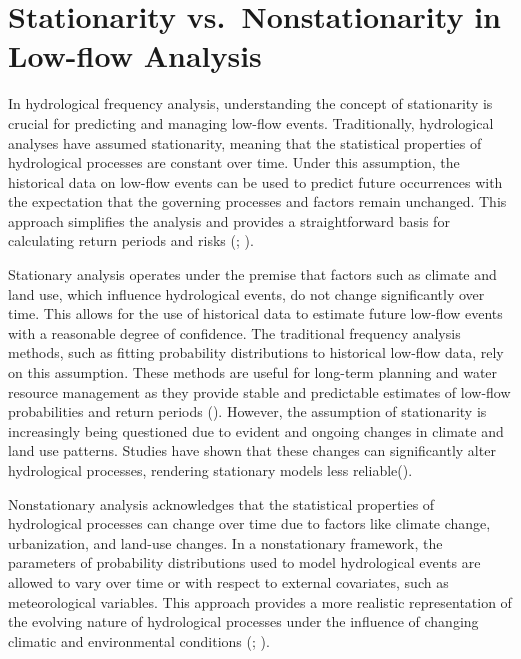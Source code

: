 \documentclass[
]{krantz}
\begin{document}
\section{Stationarity vs.~Nonstationarity in Low-flow Analysis}\label{stationarity-vs.-nonstationarity-in-low-flow-analysis}

In hydrological frequency analysis, understanding the concept of stationarity is crucial for predicting and managing low-flow events. Traditionally, hydrological analyses have assumed stationarity, meaning that the statistical properties of hydrological processes are constant over time. Under this assumption, the historical data on low-flow events can be used to predict future occurrences with the expectation that the governing processes and factors remain unchanged. This approach simplifies the analysis and provides a straightforward basis for calculating return periods and risks (\citet{Gilroy2012}; \citet{Katz2013}).

Stationary analysis operates under the premise that factors such as climate and land use, which influence hydrological events, do not change significantly over time. This allows for the use of historical data to estimate future low-flow events with a reasonable degree of confidence. The traditional frequency analysis methods, such as fitting probability distributions to historical low-flow data, rely on this assumption. These methods are useful for long-term planning and water resource management as they provide stable and predictable estimates of low-flow probabilities and return periods (\citet{Chow1988}). However, the assumption of stationarity is increasingly being questioned due to evident and ongoing changes in climate and land use patterns. Studies have shown that these changes can significantly alter hydrological processes, rendering stationary models less reliable(\citet{Milly2008}).

Nonstationary analysis acknowledges that the statistical properties of hydrological processes can change over time due to factors like climate change, urbanization, and land-use changes. In a nonstationary framework, the parameters of probability distributions used to model hydrological events are allowed to vary over time or with respect to external covariates, such as meteorological variables. This approach provides a more realistic representation of the evolving nature of hydrological processes under the influence of changing climatic and environmental conditions (\citet{Katz2002}; \citet{Milly2008}).
\end{document}
